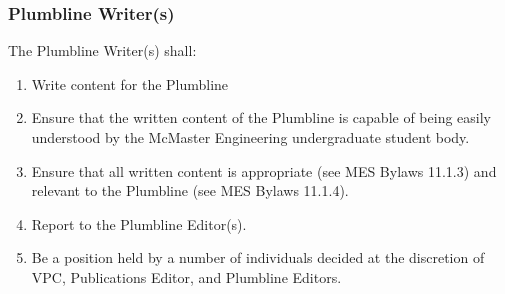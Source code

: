 \subsubsection{Plumbline Writer(s)}
\label{plumbline-writers}
The Plumbline Writer(s) shall: 

\begin{enumerate} 
  \item    
   Write content for the Plumbline 
  \item     
   Ensure that the written content of the Plumbline is capable of being easily understood by the McMaster Engineering undergraduate student body. 
  \item    
   Ensure that all written content is appropriate (see MES Bylaws 11.1.3) and relevant to the Plumbline (see MES Bylaws 11.1.4). 
  \item    
   Report to the Plumbline Editor(s). 
  \item    
   Be a position held by a number of individuals decided at the discretion of VPC, Publications Editor, and Plumbline Editors. 
\end{enumerate}